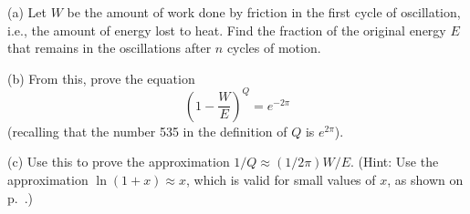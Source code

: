 (a) Let $W$ be the amount of work done by friction in the first
cycle of oscillation, i.e., the amount of energy lost to
heat. Find the fraction of the original energy $E$ that
remains in the oscillations after $n$ cycles of motion.

(b) From this, prove the equation
\begin{equation*}
  \left(1-\frac{W}{E}\right)^Q = e^{-2\pi}
\end{equation*}
(recalling that the number
535 in the definition of $Q$ is $e^{2\pi}$).

(c) Use this to prove the approximation $1/Q\approx(1/2\pi )W/E$.
(Hint: Use the approximation $\ln (1+x)\approx x$, which is valid
for small values of $x$, as shown on p.~\pageref{math-approx-exp-and-log}.)
